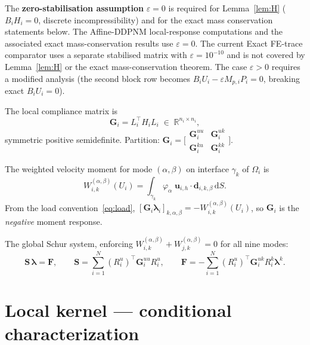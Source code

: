 \documentclass[11pt,a4paper]{article}
\newcommand{\R}{\mathbb{R}}
\newcommand{\pore}[1]{\Omega_{#1}}
\newcommand{\iface}{\gamma}
\newcommand{\vel}{\bm{u}}
\newcommand{\trac}{\bm{\lambda}}
\newcommand{\DtN}{\mathbf{G}}
\newcommand{\Schur}{\mathbf{S}}
\begin{document}
The \textbf{zero-stabilisation assumption} $\varepsilon = 0$ is
required for Lemma~\ref{lem:H} ($B_i H_i = 0$, discrete
incompressibility) and for the exact mass conservation statements
below.  The Affine-DDPNM local-response computations and the associated exact
mass-conservation results use $\varepsilon = 0$.  The current Exact
FE-trace comparator uses a separate stabilised matrix with
$\varepsilon = 10^{-10}$ and is not covered by Lemma~\ref{lem:H} or
the exact mass-conservation theorem.  The case $\varepsilon > 0$
requires a modified analysis (the second block row becomes
$B_i U_i - \varepsilon M_{p,i} P_i = 0$, breaking exact
$B_i U_i = 0$).

The local compliance matrix is
\begin{equation}\label{eq:G}
  \DtN_i = L_i^\top H_i L_i \;\in\; \R^{n_i\times n_i},
\end{equation}
symmetric positive semidefinite.  Partition:
$\DtN_i = \bigl[\begin{smallmatrix}
  \DtN_i^{uu} & \DtN_i^{uk} \\ \DtN_i^{ku} & \DtN_i^{kk}
\end{smallmatrix}\bigr]$.

The weighted velocity moment for mode $(\alpha,\beta)$ on interface
$\iface_k$ of $\pore{i}$ is
\begin{equation}\label{eq:moment}
  W_{i,k}^{(\alpha,\beta)}(U_i)
  = \int_{\iface_k} \varphi_\alpha\;
    \vel_{i,h}\cdot\bm{d}_{i,k,\beta}\,\mathrm{d}S.
\end{equation}
From the load convention~\eqref{eq:load},
$[\DtN_i\trac_i]_{k,\alpha,\beta} = -W_{i,k}^{(\alpha,\beta)}(U_i)$,
so $\DtN_i$ is the \emph{negative} moment response.

The global Schur system, enforcing $W_{i,k}^{(\alpha,\beta)}
+ W_{j,k}^{(\alpha,\beta)} = 0$ for all nine modes:
\begin{equation}\label{eq:schur}
  \Schur\,\trac = \bm{F},\qquad
  \Schur = \sum_{i=1}^N (R_i^u)^\top \DtN_i^{uu} R_i^u,\qquad
  \bm{F} = -\sum_{i=1}^N (R_i^u)^\top \DtN_i^{uk} R_i^k \trac^k.
\end{equation}

\section{Local kernel --- conditional characterization}
\end{document}
